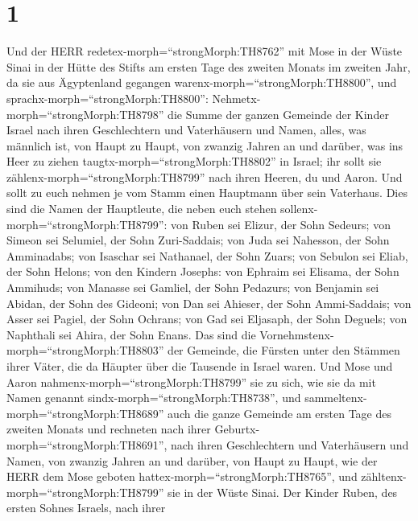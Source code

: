 \hypertarget{section}{%
\section{1}\label{section}}

 Und der HERR redetex-morph=``strongMorph:TH8762'' mit Mose
in der Wüste Sinai in der Hütte des Stifts am ersten Tage des zweiten
Monats im zweiten Jahr, da sie aus Ägyptenland gegangen
warenx-morph=``strongMorph:TH8800'', und
sprachx-morph=``strongMorph:TH8800'': 
Nehmetx-morph=``strongMorph:TH8798'' die Summe der ganzen Gemeinde der
Kinder Israel nach ihren Geschlechtern und Vaterhäusern und Namen,
alles, was männlich ist, von Haupt zu Haupt,  von zwanzig
Jahren an und darüber, was ins Heer zu ziehen
taugtx-morph=``strongMorph:TH8802'' in Israel; ihr sollt sie
zählenx-morph=``strongMorph:TH8799'' nach ihren Heeren, du und Aaron.
 Und sollt zu euch nehmen je vom Stamm einen Hauptmann über
sein Vaterhaus.  Dies sind die Namen der Hauptleute, die
neben euch stehen sollenx-morph=``strongMorph:TH8799'': von Ruben sei
Elizur, der Sohn Sedeurs;  von Simeon sei Selumiel, der Sohn
Zuri-Saddais;  von Juda sei Nahesson, der Sohn Amminadabs;
 von Isaschar sei Nathanael, der Sohn Zuars; 
von Sebulon sei Eliab, der Sohn Helons;  von den Kindern
Josephs: von Ephraim sei Elisama, der Sohn Ammihuds; von Manasse sei
Gamliel, der Sohn Pedazurs;  von Benjamin sei Abidan, der
Sohn des Gideoni;  von Dan sei Ahieser, der Sohn
Ammi-Saddais;  von Asser sei Pagiel, der Sohn Ochrans;
 von Gad sei Eljasaph, der Sohn Deguels;  von
Naphthali sei Ahira, der Sohn Enans.  Das sind die
Vornehmstenx-morph=``strongMorph:TH8803'' der Gemeinde, die Fürsten
unter den Stämmen ihrer Väter, die da Häupter über die Tausende in
Israel waren.  Und Mose und Aaron
nahmenx-morph=``strongMorph:TH8799'' sie zu sich, wie sie da mit Namen
genannt sindx-morph=``strongMorph:TH8738'',  und
sammeltenx-morph=``strongMorph:TH8689'' auch die ganze Gemeinde am
ersten Tage des zweiten Monats und rechneten nach ihrer
Geburtx-morph=``strongMorph:TH8691'', nach ihren Geschlechtern und
Vaterhäusern und Namen, von zwanzig Jahren an und darüber, von Haupt zu
Haupt,  wie der HERR dem Mose geboten
hattex-morph=``strongMorph:TH8765'', und
zähltenx-morph=``strongMorph:TH8799'' sie in der Wüste Sinai.
 Der Kinder Ruben, des ersten Sohnes Israels, nach ihrer
